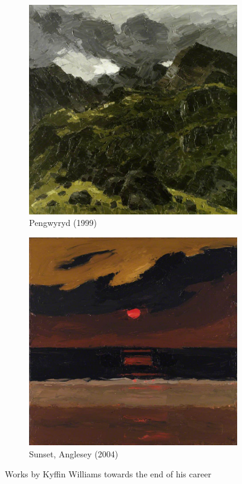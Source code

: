 \documentclass[11pt,fleqn,twoside]{article}
\begin{document}
\begin{figure}[h]
\centering
\begin{subfigure}[b]{0.4\textwidth}
  \centering
  \includegraphics[width=\textwidth]{img/nlw_nlw_gcf06690_large.jpg}
  \caption{Pengwyryd (1999)}
\end{subfigure}
\begin{subfigure}[b]{0.4\textwidth}
  \centering
  \includegraphics[width=\textwidth]{img/nlw_nlw_gcf08104_large.jpg}
  \caption{Sunset, Anglesey (2004)}
\end{subfigure}
\caption{Works by Kyffin Williams towards the end of his career}
\end{figure}
\end{document}
